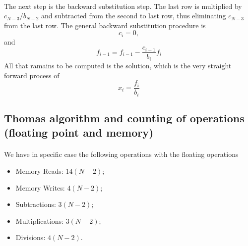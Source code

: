 \documentclass[%
oneside,                 %
final,                   %
10pt]{article}
\begin{document}
\paragraph{}
The next step is  the backward substitution step.  The last row is multiplied by $c_{N-3}/b_{N-2}$ and subtracted from the second to last row, thus eliminating $c_{N-3}$ from the last row.  The general backward substitution procedure is 
\[
	c_i = 0, 
\]
and 
\[
	f_{i-1} = f_{i-1} - \frac{c_{i-1}}{b_i}f_i
\]
All that ramains to be computed is the solution, which is the very straight forward process of
\[
x_i = \frac{f_i}{b_i}
\]



\subsection*{Thomas algorithm and counting of operations (floating point and memory)}

\paragraph{}

We have in specific case the following operations with the floating operations

\begin{itemize}
\item Memory Reads: $14(N-2)$;

\item Memory Writes: $4(N-2)$; 

\item Subtractions: $3(N-2)$; 

\item Multiplications: $3(N-2)$;

\item Divisions: $4(N-2)$.
\end{itemize}

\noindent




\paragraph{}
\end{document}
